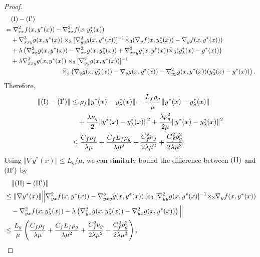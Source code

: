 \begin{proof}
{\begin{align*}
    &\quad \rm (I) - {\rm (I')} \\
    &= \nabla_{xx}^2 f(x,y^*(x)) - \nabla_{xx}^2 f(x,y_{\lambda}^*(x))  \\
    & \quad + \nabla_{xxy}^3 g(x,y^*(x)) \times_3 [\nabla_{yy}^2 g(x,y^*(x))]^{-1} \bar \times_3 ( \nabla_y f(x,y_{\lambda}^*(x)) - \nabla_y f(x,y^*(x))) \\
    &\quad + \lambda \left( \nabla_{xx}^2 g(x,y^*(x)) -  \nabla_{xx}^2 g(x,y_{\lambda}^*(x))  + \nabla_{xxy}^3  g(x,y^*(x)) \bar \times_3
    (y_{\lambda}^*(x) - y^*(x)) \right) \\
    &\quad + \lambda \nabla_{xxy}^3 g(x,y^*(x)) \times_3 [\nabla_{yy}^2 g(x,y^*(x))]^{-1} 
 \\
 &~~~~~~~~~~~~~~~~~~~~~~~~~~~\bar \times_3 \left(\nabla_y g(x,y_{\lambda}^*(x)) 
    - \nabla_y g(x,y^*(x)) - \nabla_{yy}^2 g(x,y^*(x)) (y_{\lambda}^*(x) -y^*(x))  \right).
\end{align*}}
Therefore, 
\begin{align*}
    \Vert {\rm (I) } - {\rm (I')} \Vert &\le \rho_f \Vert y^*(x) - y_{\lambda}^*(x) \Vert  + \frac{L_f \rho_g}{\mu} \Vert y^*(x) - y_{\lambda}^*(x) \Vert \\
    &\quad + \frac{\lambda \nu_g}{2} \Vert y^*(x) - y_{\lambda}^*(x) \Vert^2 + \frac{\lambda \rho_g^2}{2\mu} \Vert y^*(x) - y_{\lambda}^*(x) \Vert^2  \\
    &\le \frac{C_f \rho_f}{\lambda \mu} + \frac{C_f L_f \rho_g}{\lambda \mu^2} +  \frac{C_f^2 \nu_g}{2\lambda \mu^2}+ \frac{C_f^2 \rho_g^2}{2 \lambda \mu^3} .
\end{align*}
Using $\Vert \nabla y^*(x) \Vert \le  L_g / \mu$, we can similarly bound the difference between ${\rm (II)}$ and ${\rm (II')}$ by
{ \begin{align*}
    &\quad \lVert{\rm (II)} - {\rm (II')}\rVert \\
    &\le 
      \Vert \nabla y^*(x) \Vert \Big \Vert  \nabla_{yx}^2 f(x,y^*(x)) - \nabla_{yxy}^3 g(x,y^*(x)) \times_3 [\nabla_{yy}^2 g(x,y^*(x)]^{-1} \bar \times_3 \nabla_y f(x,y^*(x))\\
     &\quad - \nabla_{yx}^2 f(x,y_{\lambda}^*(x))-\lambda  \left(\nabla_{yx}^2 g(x,y_{\lambda}^*(x))-\nabla_{yx}^2 g(x,y^*(x)) \right) \Big \Vert \\
     & \le \frac{L_g }{\mu} \left( \frac{C_f \rho_f}{\lambda \mu} + \frac{C_f L_f \rho_g}{\lambda \mu^2}  + \frac{C_f^2 \nu_g}{2\lambda \mu^2} +\frac{C_f^2 \rho_g^2}{2 \lambda \mu^3} \right),
\end{align*}}

\end{proof}
